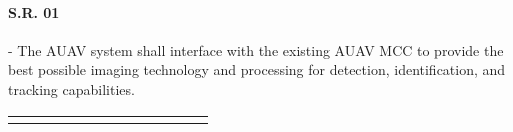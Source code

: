 \begin{fullwidth}
\begin{landscape}
    

    
    \paragraph{S.R. 01} - The AUAV system shall interface with the existing AUAV MCC to provide the best possible imaging technology and processing for detection, identification, and tracking capabilities.
    
    {\fontsize{10pt}{11pt}\selectfont
    \begin{longtable}{| L{0.12\linewidth} | L{0.16\linewidth} |  L{0.20\linewidth} | L{0.08\linewidth} | L{0.20\linewidth} | L{0.08\linewidth} |}
        \hline \endlastfoot
        

\end{longtable}}
\end{landscape}
\end{fullwidth}
